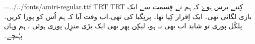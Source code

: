
\pagewidth=210mm
\pageheight=297mm
\hsize=210mm
\hsize=190mm
\hoffset=10mm
\voffset=10mm
\nopagenumbers
\parindent=0mm
\font\amiri={../../fonts/amiri-regular.ttf}
\textdir TRT
\pardir TRT
\amiri
کِتنے برس ہوۓ کہ ہم نے قِسمت سے ایک بازی لگائی تھی۔ ایک اِقرار کِیا تھا۔ پرتِگیا کی تھی۔اب وقت آیا کہ ہم اُس کو پورا کریں۔ بِلکُل پوری تو شاید اب بھی نہ ہو، لیکِن پھِر بھی ایک بڑی منزِل پوری ہوئی ، ہم وہاں پہُنچے۔ 
\bye